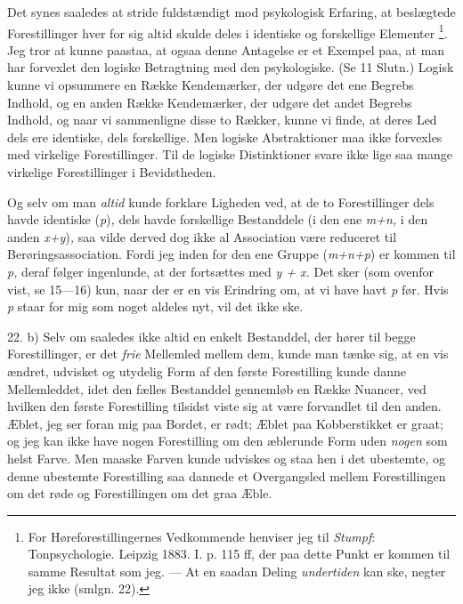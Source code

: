 \documentclass[12pt,a4paper,openany]{book}
\newcommand{\opage}[1]{\marginnote{\footnotesize\textit{[#1]}}}
\begin{document}
Det synes saaledes at stride fuldstændigt mod psykologisk Erfaring, at
beslægtede Forestillinger hver for sig altid skulde deles i identiske og
forskellige Elementer%
\footnote[2]{For Høreforestillingernes Vedkommende henviser jeg til
\emph{Stumpf}: Tonpsychologie. Leipzig 1883. I. p. 115 ff, der paa dette Punkt
er kommen til samme Resultat som jeg. --- At en saadan Deling \emph{undertiden}
kan ske, negter jeg ikke (smlgn. 22).}. Jeg tror at kunne paastaa, at ogsaa
denne Antagelse er et Exempel paa, at man har forvexlet den logiske Betragtning
med den psykologiske. (Se 11 Slutn.) Logisk kunne vi opsummere en Række
Kendemærker, der udgøre det ene Begrebs Indhold, og en anden Række Kendemærker,
der udgøre det andet Begrebs Indhold, og naar vi sammenligne disse to Rækker,
kunne vi finde, at deres Led dels ere identiske, dels forskellige. Men logiske
Abstraktioner maa ikke forvexles med virkelige Forestillinger. Til de logiske
Distinktioner svare ikke lige saa mange virkelige Forestillinger i Bevidstheden.

Og selv om man \emph{altid} kunde forklare Ligheden ved, at de to
Forestillinger dels havde identiske (\textit{p})\textit{,} dels havde
forskellige Bestanddele (i den ene \textit{m+n,} i den anden
\textit{x+y})\textit{,} saa vilde derved dog ikke al Association være reduceret
til Berøringsassociation. Fordi jeg inden for den ene Gruppe (\textit{m+n+p})
er kommen til \textit{p,} deraf følger ingenlunde, at der fortsættes med
\textit{y + x.} Det sker (som ovenfor vist, se 15---16) kun, naar der er en vis
Erindring om, at vi have havt \textit{p} før. Hvis \textit{p} staar for mig som
noget aldeles nyt, vil det ikke ske.

22. b) Selv om saaledes ikke altid en enkelt Bestanddel, der hører til begge
Forestillinger, er det \emph{frie} Mellemled mellem dem, kunde man tænke sig,
at en vis ændret, udvisket og utydelig Form af den første Forestilling kunde
danne Mellemleddet, idet den fælles Bestanddel gennemløb en Række Nuancer, ved
hvilken den første Forestilling
\setcounter{footnote}{0}%
\opage{47}tilsidst viste sig at være forvandlet til den anden. Æblet, jeg ser
foran mig paa Bordet, er rødt; Æblet paa Kobberstikket er graat; og jeg kan
ikke have nogen Forestilling om den æblerunde Form uden \emph{nogen} som helst
Farve. Men maaske Farven kunde udviskes og staa hen i det ubestemte, og denne
ubestemte Forestilling saa dannede et Overgangsled mellem Forestillingen om det
røde og Forestillingen om det graa Æble.
\end{document}
